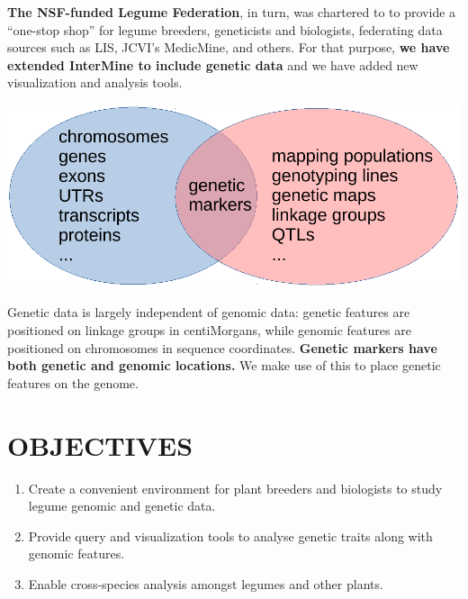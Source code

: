 \documentclass[]{pagposter}
\newlength{\figwidth}
\begin{document}
\begin{multicols*}{3}
  \textbf{The NSF-funded Legume Federation}, in turn, was chartered to to provide a ``one-stop shop'' for legume breeders, geneticists and biologists, federating data sources such as LIS, JCVI's MedicMine, and others.
  For that purpose, \textbf{we have extended InterMine to include genetic data} and we have added new visualization and analysis tools.

  \begin{center}
    \includegraphics[width=\figwidth]{genetics-genomics-venn.pdf} %
  \end{center}

  Genetic data is largely independent of genomic data: genetic features are positioned on linkage groups in centiMorgans, while genomic features are positioned on chromosomes in sequence coordinates.
  \textbf{Genetic markers have both genetic and genomic locations.} We make use of this to place genetic features on the genome.


  \section*{OBJECTIVES}
  
  \begin{enumerate}
  \item Create a convenient environment for plant breeders and biologists to study legume genomic and genetic data.
  \item Provide query and visualization tools to analyse genetic traits along with genomic features.
  \item Enable cross-species analysis amongst legumes and other plants.
  \end{enumerate}


\end{multicols*}
\end{document}
